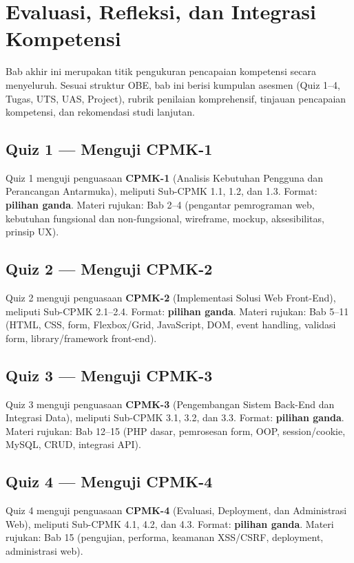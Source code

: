 \section{Evaluasi, Refleksi, dan Integrasi Kompetensi}

Bab akhir ini merupakan titik pengukuran pencapaian kompetensi secara menyeluruh. Sesuai struktur OBE, bab ini berisi kumpulan asesmen (Quiz 1--4, Tugas, UTS, UAS, Project), rubrik penilaian komprehensif, tinjauan pencapaian kompetensi, dan rekomendasi studi lanjutan.

\subsection{Quiz 1 --- Menguji CPMK-1}

Quiz 1 menguji penguasaan \textbf{CPMK-1} (Analisis Kebutuhan Pengguna dan Perancangan Antarmuka), meliputi Sub-CPMK 1.1, 1.2, dan 1.3. Format: \textbf{pilihan ganda}. Materi rujukan: Bab 2--4 (pengantar pemrograman web, kebutuhan fungsional dan non-fungsional, wireframe, mockup, aksesibilitas, prinsip UX).

\subsection{Quiz 2 --- Menguji CPMK-2}

Quiz 2 menguji penguasaan \textbf{CPMK-2} (Implementasi Solusi Web Front-End), meliputi Sub-CPMK 2.1--2.4. Format: \textbf{pilihan ganda}. Materi rujukan: Bab 5--11 (HTML, CSS, form, Flexbox/Grid, JavaScript, DOM, event handling, validasi form, library/framework front-end).

\subsection{Quiz 3 --- Menguji CPMK-3}

Quiz 3 menguji penguasaan \textbf{CPMK-3} (Pengembangan Sistem Back-End dan Integrasi Data), meliputi Sub-CPMK 3.1, 3.2, dan 3.3. Format: \textbf{pilihan ganda}. Materi rujukan: Bab 12--15 (PHP dasar, pemrosesan form, OOP, session/cookie, MySQL, CRUD, integrasi API).

\subsection{Quiz 4 --- Menguji CPMK-4}

Quiz 4 menguji penguasaan \textbf{CPMK-4} (Evaluasi, Deployment, dan Administrasi Web), meliputi Sub-CPMK 4.1, 4.2, dan 4.3. Format: \textbf{pilihan ganda}. Materi rujukan: Bab 15 (pengujian, performa, keamanan XSS/CSRF, deployment, administrasi web).

